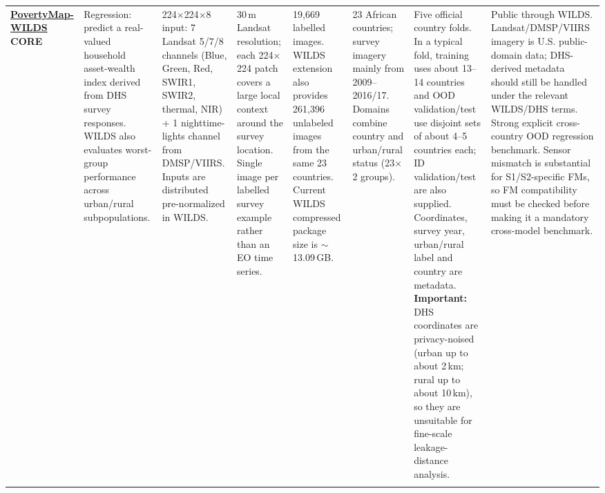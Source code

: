 \documentclass[11pt,a4paper]{article}
\begin{document}
\begin{landscape}
\begin{longtable}{
    Q{1.8cm}
    Q{2.5cm}
    Q{3.0cm}
    Q{2.5cm}
    Q{2.1cm}
    Q{3.0cm}
    Q{3.4cm}
    Q{3.4cm}
}
\href{https://wilds.stanford.edu/datasets/}{\textbf{PovertyMap-WILDS}}\newline
\textbf{CORE}
&
Regression: predict a real-valued household asset-wealth index derived from DHS survey responses. WILDS also evaluates worst-group performance across urban/rural subpopulations.
&
224$\times$224$\times$8 input: 7 Landsat 5/7/8 channels (Blue, Green, Red, SWIR1, SWIR2, thermal, NIR) + 1 nighttime-lights channel from DMSP/VIIRS. Inputs are distributed pre-normalized in WILDS.
&
30\,m Landsat resolution; each 224$\times$224 patch covers a large local context around the survey location. Single image per labelled survey example rather than an EO time series.
&
19,669 labelled images. WILDS extension also provides 261,396 unlabeled images from the same 23 countries. Current WILDS compressed package size is $\sim$13.09\,GB.
&
23 African countries; survey imagery mainly from 2009--2016/17. Domains combine country and urban/rural status (23$\times$2 groups).
&
Five official country folds. In a typical fold, training uses about 13--14 countries and OOD validation/test use disjoint sets of about 4--5 countries each; ID validation/test are also supplied. Coordinates, survey year, urban/rural label and country are metadata. \textbf{Important:} DHS coordinates are privacy-noised (urban up to about 2\,km; rural up to about 10\,km), so they are unsuitable for fine-scale leakage-distance analysis.
&
Public through WILDS. Landsat/DMSP/VIIRS imagery is U.S. public-domain data; DHS-derived metadata should still be handled under the relevant WILDS/DHS terms. Strong explicit cross-country OOD regression benchmark. Sensor mismatch is substantial for S1/S2-specific FMs, so FM compatibility must be checked before making it a mandatory cross-model benchmark.
\\
\addlinespace


\end{longtable}
\end{landscape}
\end{document}
